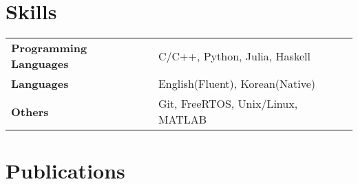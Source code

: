 \documentclass[letterpaper,9pt]{article}
\begin{document}

{\selectfont
\section{Skills}
}
\vspace{-2.5mm}
\begin{tabularx}{\linewidth}{@{}l X@{}}
\textbf{Programming Languages} &  \normalsize{C/C++, Python, Julia, Haskell}\\
\textbf{Languages}  &  \normalsize{English(Fluent), Korean(Native)}\\
\textbf{Others}  &  \normalsize{Git, FreeRTOS, Unix/Linux, MATLAB}\\
\end{tabularx}

{\selectfont
\section{Publications}
}
\vspace{-2mm}
\begin{refsection}
\nocite{*}
\printbibliography[heading=none]
\end{refsection}

\vfill
{}
\end{document}
